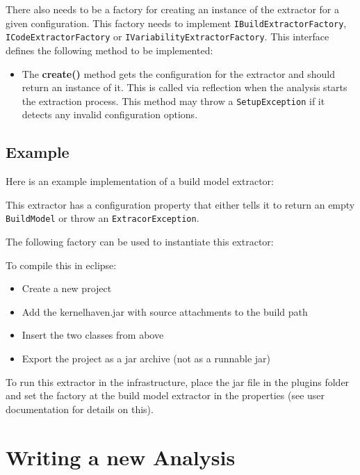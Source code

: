 There also needs to be a factory for creating an instance of the extractor for a given configuration. This factory needs to implement \texttt{IBuildExtractorFactory}, \texttt{ICodeExtractorFactory} or \texttt{IVariabilityExtractorFactory}. This interface defines the following method to be implemented:
\begin{itemize}
    \item The \textbf{create()} method gets the configuration for the extractor and should return an instance of it. This is called via reflection when the analysis starts the extraction process. This method may throw a \texttt{SetupException} if it detects any invalid configuration options.
\end{itemize}

\section{Example}

Here is an example implementation of a build model extractor:



This extractor has a configuration property that either tells it to return an empty \texttt{BuildModel} or throw an \texttt{ExtracorException}.

The following factory can be used to instantiate this extractor:



To compile this in eclipse:
\begin{itemize}
    \item Create a new project
    \item Add the kernelhaven.jar with source attachments to the build path
    \item Insert the two classes from above
    \item Export the project as a jar archive (not as a runnable jar)
\end{itemize}

To run this extractor in the infrastructure, place the jar file in the plugins folder and set the factory at the build model extractor in the properties (see user documentation for details on this).




\chapter{Writing a new Analysis}
\label{sec:Analysis}
